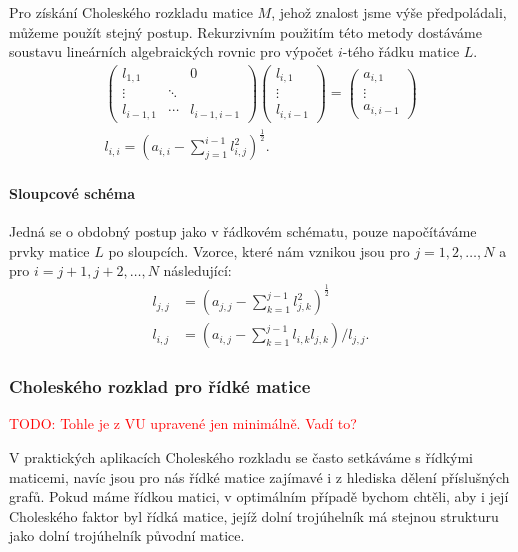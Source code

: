 \documentclass[11pt,american,czech,oneside]{book}
\theoremstyle{plain}
\theoremstyle{definition}
\newcommand{\TODO}[1]{\textcolor{red}{TODO: #1}}
\begin{document}
Pro získání Choleského rozkladu matice $M$, jehož znalost jsme výše předpoládali, můžeme použít stejný postup. Rekurzivním použitím této metody dostáváme soustavu lineárních algebraických rovnic pro výpočet $i$-tého řádku matice $L$.
\begin{gather*}
\begin{pmatrix}
  l_{1,1} &  & 0 \\
  \vdots  & \ddots &  \\
  l_{i-1,1} & \cdots & l_{i-1,i-1}
\end{pmatrix}
\begin{pmatrix}
  l_{i,1} \\
  \vdots \\
  l_{i,i-1}
\end{pmatrix}
=
\begin{pmatrix}
  a_{i,1} \\
  \vdots \\
  a_{i,i-1}
\end{pmatrix} \\
 l_{i,i} = \left(a_{i,i} - \sum_{j=1}^{i-1}{l_{i,j}^2}\right)^\frac12.
\end{gather*}

\paragraph{Sloupcové schéma}
Jedná se o obdobný postup jako v řádkovém schématu, pouze napočítáváme prvky matice $L$ po sloupcích. Vzorce, které nám vznikou jsou pro $j = 1,2,\ldots, N$ a pro $i = j+1,j+2,\ldots,N$ následující:
\begin{align*}
  l_{j,j} &= \left(a_{j,j} - \sum_{k=1}^{j-1}{l_{j,k}^2}\right)^\frac12 \\
  l_{i,j} &= \left(a_{i,j} - \sum_{k=1}^{j-1}{l_{i,k}l_{j,k}}\right)/l_{j,j}.
\end{align*}

\subsubsection{Choleského rozklad pro řídké matice}
\label{Choleskysparse}
\TODO{Tohle je z VU upravené jen minimálně. Vadí to?}

V praktických aplikacích Choleského rozkladu se často setkáváme s řídkými maticemi, navíc jsou pro nás řídké matice zajímavé i z hlediska dělení příslušných grafů. Pokud máme řídkou matici, v optimálním případě bychom chtěli, aby i její Choleského faktor byl řídká matice, jejíž dolní trojúhelník má stejnou strukturu jako dolní trojúhelník původní matice.
\end{document}
